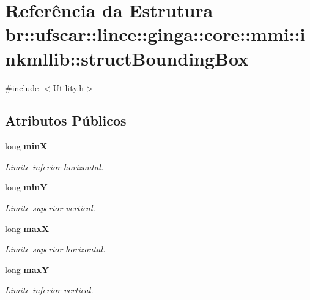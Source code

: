 \section{Referência da Estrutura br::ufscar::lince::ginga::core::mmi::inkmllib::structBoundingBox}
\label{structbr_1_1ufscar_1_1lince_1_1ginga_1_1core_1_1mmi_1_1inkmllib_1_1structBoundingBox}


{\ttfamily \#include $<$Utility.h$>$}

\subsection*{Atributos Públicos}
\begin{DoxyCompactItemize}
\item 
long {\bf minX}\label{structbr_1_1ufscar_1_1lince_1_1ginga_1_1core_1_1mmi_1_1inkmllib_1_1structBoundingBox_a909b122c96d0e5584c519a0944b5fc6a}

\begin{DoxyCompactList}\small\item\em Limite inferior horizontal. \item\end{DoxyCompactList}\item 
long {\bf minY}\label{structbr_1_1ufscar_1_1lince_1_1ginga_1_1core_1_1mmi_1_1inkmllib_1_1structBoundingBox_a776577ef30a54223fd275f07f0bff36a}

\begin{DoxyCompactList}\small\item\em Limite superior vertical. \item\end{DoxyCompactList}\item 
long {\bf maxX}\label{structbr_1_1ufscar_1_1lince_1_1ginga_1_1core_1_1mmi_1_1inkmllib_1_1structBoundingBox_af5f666e90db4a721765db9884da8affe}

\begin{DoxyCompactList}\small\item\em Limite superior horizontal. \item\end{DoxyCompactList}\item 
long {\bf maxY}\label{structbr_1_1ufscar_1_1lince_1_1ginga_1_1core_1_1mmi_1_1inkmllib_1_1structBoundingBox_a8f05573019dd330229cebf9af20eb067}

\begin{DoxyCompactList}\small\item\em Limite inferior vertical. \item\end{DoxyCompactList}\end{DoxyCompactItemize}


